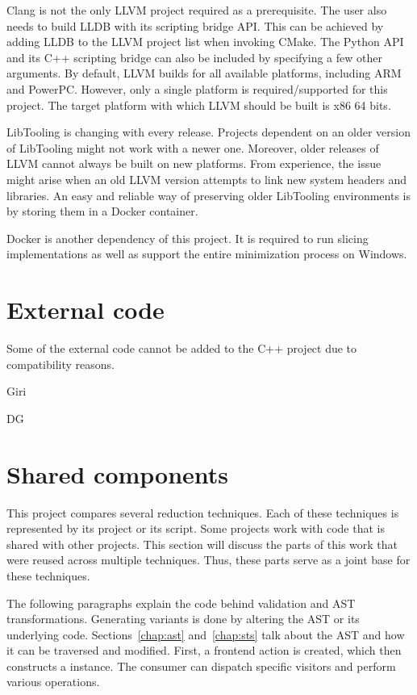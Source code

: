 Clang is not the only LLVM project required as a prerequisite.
The user also needs to build LLDB with its scripting bridge API.
This can be achieved by adding LLDB to the LLVM project list when invoking 
CMake.
The Python API and its C++ scripting bridge can also be included by 
specifying a few other arguments.
By default, LLVM builds for all available platforms, including ARM and 
PowerPC.
However, only a single platform is required/supported for this project.
The target platform with which LLVM should be built is x86 64 bits.

LibTooling is changing with every release.
Projects dependent on an older version of LibTooling might not work with 
a newer one.
Moreover, older releases of LLVM cannot always be built on new platforms.
From experience, the issue might arise when an old LLVM version attempts 
to link new system headers and libraries.
An easy and reliable way of preserving older LibTooling environments is by 
storing them in a Docker container.

Docker is another dependency of this project.
It is required to run slicing implementations as well as support the entire 
minimization process on Windows.

\section{External code}

Some of the external code cannot be added to the C++ project due to 
compatibility reasons.

Giri

DG

\section{Shared components}

This project compares several reduction techniques.
Each of these techniques is represented by its project or its script.
Some projects work with code that is shared with other projects.
This section will discuss the parts of this work that were reused across 
multiple techniques.
Thus, these parts serve as a joint base for these techniques.

The following paragraphs explain the code behind validation and AST 
transformations.
Generating variants is done by altering the AST or its underlying code.
Sections~\ref{chap:ast} and~\ref{chap:sts} talk about the AST and how it can 
be traversed and modified.
First, a frontend action is created, which then constructs a  
instance.
The consumer can dispatch specific visitors and perform various operations.

